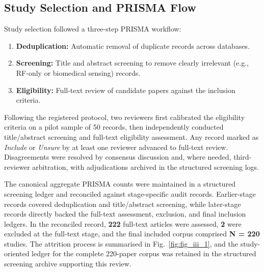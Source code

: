 \documentclass[lettersize,journal]{IEEEtran}
\begin{document}
\subsection{Study Selection and PRISMA Flow}
Study selection followed a three-step PRISMA workflow:
\begin{enumerate}
    \item \textbf{Deduplication:} Automatic removal of duplicate records across databases.
    \item \textbf{Screening:} Title and abstract screening to remove clearly irrelevant (e.g., RF-only or biomedical sensing) records.
    \item \textbf{Eligibility:} Full-text review of candidate papers against the inclusion criteria.
\end{enumerate}

Following the registered protocol, two reviewers first calibrated the eligibility criteria on a pilot sample of 50 records, then independently conducted title/abstract screening and full-text eligibility assessment. Any record marked as \textit{Include} or \textit{Unsure} by at least one reviewer advanced to full-text review. Disagreements were resolved by consensus discussion and, where needed, third-reviewer arbitration, with adjudications archived in the structured screening logs.

The canonical aggregate PRISMA counts were maintained in a structured screening ledger and reconciled against stage-specific audit records. Earlier-stage records covered deduplication and title/abstract screening, while later-stage records directly backed the full-text assessment, exclusion, and final inclusion ledgers. In the reconciled record, \textbf{222} full-text articles were assessed, \textbf{2} were excluded at the full-text stage, and the final included corpus comprised \textbf{N = 220} studies. The attrition process is summarised in Fig.~\ref{fig:fig_iii_1}, and the study-oriented ledger for the complete 220-paper corpus was retained in the structured screening archive supporting this review.
\end{document}
